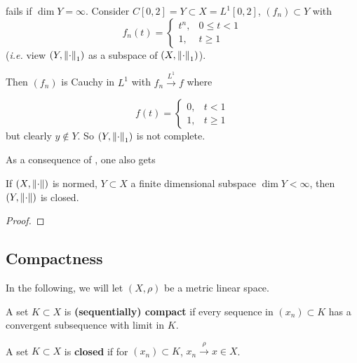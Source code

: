 \documentclass{article}
\begin{document}
\begin{example}
     fails if $\dim Y =\infty$. Consider $C[0,2]=Y \subset X = L^1[0,2]$, $(f_n) \subset Y$ with  
    $$
    f_n(t) = \begin{cases}
        t^n, & 0\leq t <1 \\
        1, & t\geq 1
    \end{cases}
    $$  
    (\textit{i.e.} view $(Y, \left\|{\cdot}\right\|_1)$ as a subspace of $(X, \left\|{\cdot}\right\|_1)$). 
    
    Then $(f_n)$ is Cauchy in $L^1$ with $f_n \overset{L^1}{\longrightarrow} f$ where  

    $$
    f(t) = \begin{cases}
        0, & t<1 \\
        1, & t \geq 1
    \end{cases}
    $$  
    but clearly $y \notin Y$. So $(Y, \left\|{\cdot}\right\|_1)$ is not complete. 
\end{example}

As a consequence of , one also gets  

\begin{corollary}
\label{finite dim is closed}
    If $(X, \left\|{\cdot}\right\|)$ is normed, $Y \subset X$ a finite dimensional subspace $\dim Y < \infty$, then $(Y, \left\|{\cdot}\right\|)$ is closed.
\end{corollary}
\begin{proof}
    
\end{proof}

\subsection{Compactness}  

In the following, we will let $(X, \rho)$ be a metric linear space.  

\begin{definition}[Compact] \nextline
    A set $K \subset X$ is \textbf{(sequentially) compact} 
    if every sequence in $(x_n) \subset K$ has a convergent subsequence with limit in $K$.
\end{definition}    

\begin{definition}[Closed]\nextline
    A set $K \subset X$ is \textbf{closed} if for $(x_n) \subset K$, $x_n \overset{\rho}{\longrightarrow} x \in X$.
\end{definition}
\end{document}
